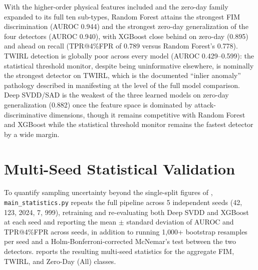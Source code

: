 \documentclass[12pt, a4paper]{report}
\begin{document}
With the higher-order physical features included and the zero-day family expanded to its full ten sub-types, Random Forest attains the strongest FIM discrimination (AUROC 0.944) and the strongest zero-day generalization of the four detectors (AUROC 0.940), with XGBoost close behind on zero-day (0.895) and ahead on recall (TPR@4\%FPR of 0.789 versus Random Forest's 0.778). TWIRL detection is globally poor across every model (AUROC 0.429--0.599): the statistical threshold monitor, despite being uninformative elsewhere, is nominally the strongest detector on TWIRL, which is the documented ``inlier anomaly'' pathology described in  manifesting at the level of the full model comparison. Deep SVDD/SAD is the weakest of the three learned models on zero-day generalization (0.882) once the feature space is dominated by attack-discriminative dimensions, though it remains competitive with Random Forest and XGBoost while the statistical threshold monitor remains the fastest detector by a wide margin.

\section{Multi-Seed Statistical Validation}\label{sec:statval_bootstrap}
To quantify sampling uncertainty beyond the single-split figures of , \texttt{main\_statistics.py} repeats the full pipeline across 5 independent seeds (42, 123, 2024, 7, 999), retraining and re-evaluating both Deep SVDD and XGBoost at each seed and reporting the mean $\pm$ standard deviation of AUROC and TPR@4\%FPR across seeds, in addition to running 1{,}000+ bootstrap resamples per seed and a Holm-Bonferroni-corrected McNemar's test between the two detectors.  reports the resulting multi-seed statistics for the aggregate FIM, TWIRL, and Zero-Day (All) classes.

\begin{table}[H]
\centering
\caption{Multi-seed statistical results (5 seeds: 42, 123, 2024, 7, 999) for Deep SVDD and XGBoost.}
\label{tab:multiseed}
\end{table}
\end{document}
